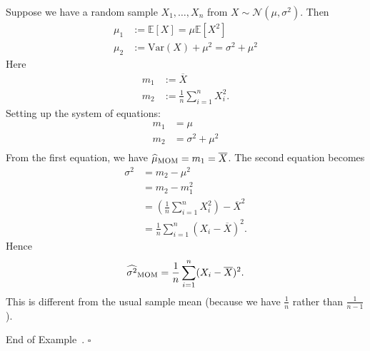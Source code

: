 \documentclass[10pt]{article}
\theoremstyle{definition}
\newtheorem{example}[theorem]{Example}
\renewenvironment{example}
{\begin{oldexample}}
  {\par\smallskip\hfill   End of Example~\theexample. $\square$    \par\end{oldexample}}
\newcommand{\1}[1]{\textbf{1}_{\left[#1\right]}} %
\def\E{\mathbb{E}} %
\def\Var{\mathrm{Var}} %
\begin{document}
\begin{example}
  Suppose we have a random sample  $X_{1},\ldots,X_{n}$ from
  $X\sim \mathcal{N}(\mu,\sigma^{2})$. Then
  \begin{align*}
    \mu_{1} 
    &:= \E\left[X \right] = \mu \E\left[X^{2} \right] \\
    \mu_{2}
    &:= \Var(X)+ \mu^{2} = \sigma^{2}+\mu^{2}
\end{align*}
  Here
  \begin{align*}
    m_{1}&:= \overline{X}  \\
    m_{2}&:= \frac{1}{n}\sum_{i=1}^{n} X_{i}^{2}.
\end{align*}
  Setting up the system of equations:
  \begin{align*}
    m_{1} &= \mu \\
    m_{2} &= \sigma^{2}+\mu^{2} \\
  \end{align*}
  From the first equation, we have $\widehat{\mu}_{\rm MOM}= m_{1} =
  \overline{X}$. The second equation becomes
  \begin{align}
    \sigma^{2} 
    &= m_{2} - \mu^{2} \nonumber\\
    &= m_{2} - m_{1}^{2}\nonumber\\
    &= \left(\frac{1}{n}\sum_{i=1}^{n}X_{i}^{2}\right) - \overline{X}^{2} \label{eq:36}\\
    &= \frac{1}{n}\sum_{i=1}^{n} (X_{i}-\overline{X})^{2}.\nonumber
  \end{align}
  Hence
  \begin{equation*}
    \widehat{\sigma^{2}}_{\rm MOM}=\frac{1}{n}\sum_{i=1}^{n}
    (X_{i}-\overline{X})^{2}.
  \end{equation*}
  This is different from the usual sample mean (because we have $\frac{1}{n}$
  rather than $\frac{1}{n-1}$).


\end{example}
\end{document}
